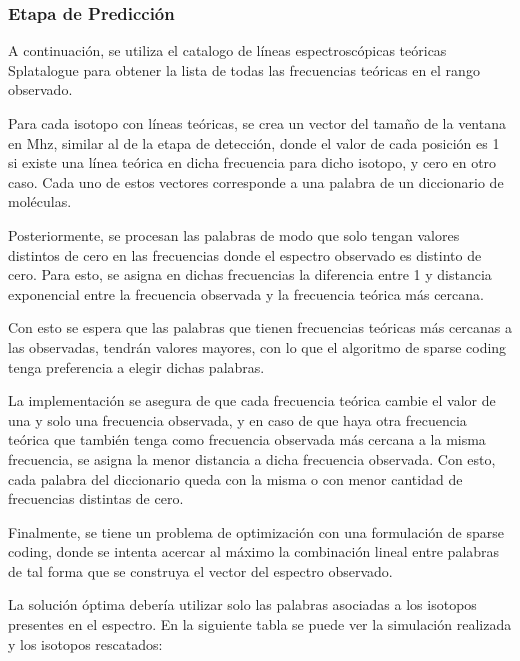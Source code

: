 \subsubsection{Etapa de Predicción}

A continuación, se utiliza el catalogo de líneas espectroscópicas teóricas Splatalogue para obtener la lista de todas las frecuencias teóricas en el rango observado.

Para cada isotopo con líneas teóricas, se crea un vector del tamaño de la ventana en Mhz, similar al de la etapa de detección, donde el valor de cada posición es 1 si existe una línea teórica en dicha frecuencia para dicho isotopo, y cero en otro caso. Cada uno de estos vectores corresponde a una palabra de un diccionario de moléculas.

Posteriormente, se procesan las palabras de modo que solo tengan valores distintos de cero en las frecuencias donde el espectro observado es distinto de cero. Para esto, se asigna en dichas frecuencias la diferencia entre 1 y distancia exponencial entre la frecuencia observada y la frecuencia teórica más cercana.

Con esto se espera que las palabras que tienen frecuencias teóricas más cercanas a las observadas, tendrán valores mayores, con lo que el algoritmo de sparse coding tenga preferencia a elegir dichas palabras.

La implementación se asegura de que cada frecuencia teórica cambie el valor de una y solo una frecuencia observada, y en caso de que haya otra frecuencia teórica que también tenga como frecuencia observada más cercana a la misma frecuencia, se asigna la menor distancia a dicha frecuencia observada. Con esto, cada palabra del diccionario queda con la misma o con menor cantidad de frecuencias distintas de cero.

Finalmente, se tiene un problema de optimización con una formulación de sparse coding, donde se intenta acercar  al máximo la combinación lineal entre palabras de tal forma que se construya el vector del espectro observado.

La solución óptima debería utilizar solo las palabras asociadas a los isotopos presentes en el espectro. En la siguiente tabla se puede ver la simulación realizada y los isotopos rescatados:

